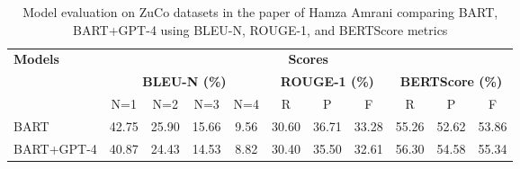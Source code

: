 \documentclass[journal]{IEEEtran}
\begin{document}
\begin{table*}[!t]
	\renewcommand{\arraystretch}{1.3}
	\caption{\large Model evaluation on ZuCo datasets in the paper of Hamza Amrani \cite{Amrani}  comparing BART, BART+GPT-4 using BLEU-N, ROUGE-1, and BERTScore metrics}
	\label{tab:Table_of_literature_results}
	\centering
	\fontsize{12pt}{12pt}\selectfont
	\begin{tabular}{|l|cccc|ccc|ccc|}
		\hline
		\multirow{2}{*}{\textbf{Models}} & \multicolumn{10}{c|}{\textbf{Scores}} \\
		\cline{2-11}
		& \multicolumn{4}{c|}{\textbf{BLEU-N (\%)}} & \multicolumn{3}{c|}{\textbf{ROUGE-1 (\%)}} & \multicolumn{3}{c|}{\textbf{BERTScore (\%)}} \\
		\cline{2-11}
		           & N=1   & N=2   & N=3   & N=4  & R     & P     & F     & R     & P     & F     \\
		\hline
		BART       & 42.75 & 25.90 & 15.66 & 9.56 & 30.60 & 36.71 & 33.28 & 55.26 & 52.62 & 53.86 \\
		BART+GPT-4 & 40.87 & 24.43 & 14.53 & 8.82 & 30.40 & 35.50 & 32.61 & 56.30 & 54.58 & 55.34 \\
		          
		\hline
	\end{tabular}
\end{table*}
\end{document}
